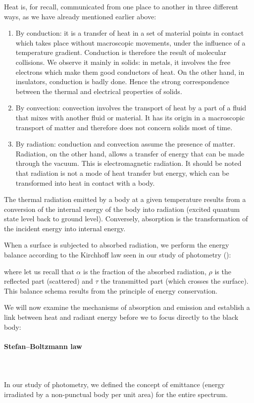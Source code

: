 	Heat is, for recall, communicated from one place to another in three different ways, as we have already mentioned earlier above:
	\begin{enumerate}
		\item By conduction: it is a transfer of heat in a set of material points in contact which takes place without macroscopic movements, under the influence of a temperature gradient. Conduction is therefore the result of molecular collisions. We observe it mainly in solids: in metals, it involves the free electrons which make them good conductors of heat. On the other hand, in insulators, conduction is badly done. Hence the strong correspondence between the thermal and electrical properties of solids.

		\item By convection: convection involves the transport of heat by a part of a fluid that mixes with another fluid or material. It has its origin in a macroscopic transport of matter and therefore does not concern solids most of time.
	
		\item By radiation: conduction and convection assume the presence of matter. Radiation, on the other hand, allows a transfer of energy that can be made through the vacuum. This is electromagnetic radiation. It should be noted that radiation is not a mode of heat transfer but energy, which can be transformed into heat in contact with a body.
	\end{enumerate}
	The thermal radiation emitted by a body at a given temperature results from a conversion of the internal energy of the body into radiation (excited quantum state level back to ground level). Conversely, absorption is the transformation of the incident energy into internal energy.

	When a surface is subjected to absorbed radiation, we perform the energy balance according to the Kirchhoff law seen in our study of photometry ():
	
	where let us recall that $\alpha$ is the fraction of the absorbed radiation, $\rho$ is the reflected part (scattered) and $\tau$ the transmitted part (which crosses the surface). This balance schema results from the principle of energy conservation.

	We will now examine the mechanisms of absorption and emission and establish a link between heat and radiant energy before we to focus directly to the black body:
	
	\paragraph{Stefan–Boltzmann law}\mbox{}\\\\
	In our study of photometry, we defined the concept of emittance (energy irradiated by a non-punctual body per unit area) for the entire spectrum.

